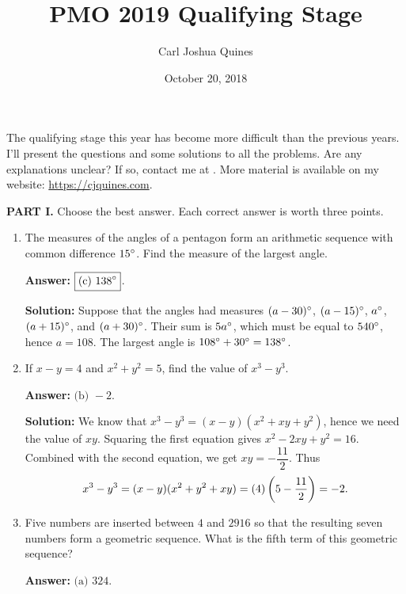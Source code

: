 \documentclass[11pt,paper=letter]{scrartcl}
\begin{document}
\title{PMO 2019 Qualifying Stage}
\author{Carl Joshua Quines}
\date{October 20, 2018}

\maketitle

The qualifying stage this year has become more difficult than the previous years. I'll present the questions and some solutions to all the problems. Are any explanations unclear? If so, contact me at . More material is available on my website: \url{https://cjquines.com}.

\textbf{PART I.} Choose the best answer. Each correct answer is worth three points.

\begin{enumerate}[left=0pt]

\item The measures of the angles of a pentagon form an arithmetic sequence with common difference $15^\circ$. Find the measure of the largest angle.

\fourch{$78\dg$}{$103\dg$}{$138\dg$}{$153\dg$}

\textbf{Answer:} $\boxed{\text{(c) }138^\circ}$.

\textbf{Solution:} Suppose that the angles had measures $(a-30)^\circ$, $(a-15)^\circ$, $a^\circ$, $(a+15)^\circ$, and $(a+30)^\circ$. Their sum is $5a^\circ$, which must be equal to $540^\circ$, hence $a = 108$. The largest angle is $108^\circ + 30^\circ = 138^\circ$.

\item If $x - y = 4$ and $x^2 + y^2 = 5$, find the value of $x^3 - y^3$.


\textbf{Answer:} $\boxed{\text{(b) }-2}$.

\textbf{Solution:} We know that $x^3 - y^3 = (x-y)(x^2 + xy + y^2)$, hence we need the value of $xy$. Squaring the first equation gives $x^2 - 2xy + y^2 = 16$. Combined with the second equation, we get $xy = -\dfrac{11}2$. Thus $$x^3 - y^3 = (x - y)(x^2 + y^2 + xy) = (4)\left( 5 - \frac{11}2 \right) = -2.$$

\item Five numbers are inserted between $4$ and $2916$ so that the resulting seven numbers form a geometric sequence. What is the fifth term of this geometric sequence?


\textbf{Answer:} $\boxed{\text{(a) }324}$.


\end{enumerate}
\end{document}
